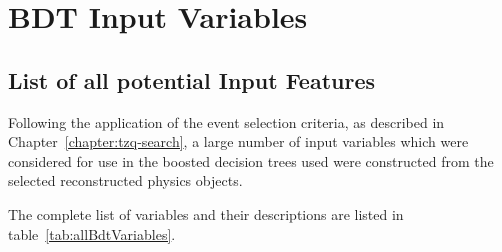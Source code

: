 \chapter{BDT Input Variables}\label{app:bdt}
\section{List of all potential Input Features}\label{appsec:bdtFeatures}
Following the application of the event selection criteria, as described in Chapter~\ref{chapter:tzq-search}, a large number of input variables which were considered for use in the boosted decision trees used were constructed from the selected reconstructed physics objects.

The complete list of variables and their descriptions are listed in table~\ref{tab:allBdtVariables}.

